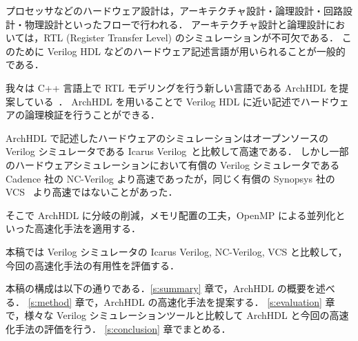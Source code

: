 プロセッサなどのハードウェア設計は，アーキテクチャ設計・論理設計・回路設計・物理設計といったフローで行われる．
アーキテクチャ設計と論理設計においては，RTL (Register Transfer Level) のシミュレーションが不可欠である．
このために Verilog HDL などのハードウェア記述言語が用いられることが一般的である．

我々は C++ 言語上で RTL モデリングを行う新しい言語である ArchHDL を提案している~\cite{satos:archhdl}．
ArchHDL を用いることで Verilog HDL に近い記述でハードウェアの論理検証を行うことができる．

ArchHDL で記述したハードウェアのシミュレーションはオープンソースの Verilog シミュレータである Icarus Verilog~\cite{iverilog}と比較して高速である．
しかし一部のハードウェアシミュレーションにおいて有償の Verilog シミュレータである Cadence 社の NC-Verilog より高速であったが，同じく有償の Synopsys 社の VCS~\cite{vcs} より高速ではないことがあった．

そこで ArchHDL に分岐の削減，メモリ配置の工夫，OpenMP による並列化といった高速化手法を適用する．

本稿では Verilog シミュレータの Icarus Verilog, NC-Verilog, VCS と比較して，
今回の高速化手法の有用性を評価する．

本稿の構成は以下の通りである．\ref{s:summary} 章で，ArchHDL の概要を述べる．
\ref{s:method} 章で，ArchHDL の高速化手法を提案する．
\ref{s:evaluation} 章で，様々な Verilog シミュレーションツールと比較して ArchHDL と今回の高速化手法の評価を行う．
\ref{s:conclusion} 章でまとめる．